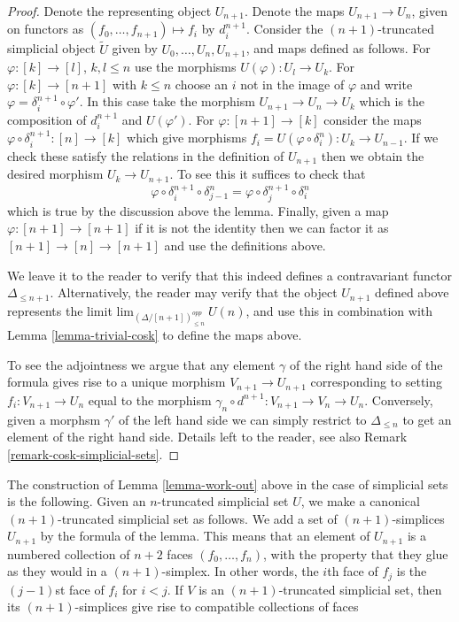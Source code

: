 \begin{proof}
Denote the representing object $U_{n + 1}$. Denote the maps
$U_{n + 1} \to U_n$, given on functors as
$(f_0,\ldots,f_{n + 1}) \mapsto f_i$ by
$d^{n + 1}_i$. Consider the $(n + 1)$-truncated
simplicial object $\tilde U$ given by $U_0, \ldots, U_n, U_{n + 1}$, and
maps defined as follows. For $\varphi : [k] \to [l]$, $k,l \leq n$
use the morphisms $U(\varphi) : U_l \to U_k$.
For $\varphi : [k] \to [n + 1]$ with $k \leq n$ choose
an $i$ not in the image of $\varphi$ and write
$\varphi = \delta^{n + 1}_i \circ \varphi'$. In this case take
the morphism $U_{n + 1} \to U_n \to U_k$ which is
the composition of $d^{n + 1}_i$ and $U(\varphi')$.
For $\varphi : [n + 1] \to [k]$ consider the maps
$\varphi \circ \delta^{n + 1}_i : [n] \to [k]$ which
give morphisms $f_i = U(\varphi \circ \delta^n_i) : U_k \to U_{n - 1}$.
If we check these satisfy the relations in the definition
of $U_{n + 1}$ then we obtain the desired morphism $U_k \to U_{n + 1}$.
To see this it suffices to check that
$$
\varphi \circ \delta^{n + 1}_i \circ \delta^n_{j - 1}
=
\varphi \circ \delta^{n + 1}_j \circ \delta^n_i
$$
which is true by the discussion above the lemma.
Finally, given a map $\varphi : [n + 1] \to [n + 1]$
if it is not the identity then we can factor it
as $[n + 1] \to [n] \to [n + 1]$ and use the definitions
above.

\medskip\noindent
We leave it to the reader to verify that this indeed
defines a contravariant functor $\Delta_{\leq n + 1}$.
Alternatively, the reader may verify that the object $U_{n + 1}$
defined above represents the limit
$\text{lim}_{(\Delta/[n + 1])_{\leq n}^{opp}}\ U(n)$,
and use this in combination with Lemma \ref{lemma-trivial-cosk} to define
the maps above.

\medskip\noindent
To see the adjointness we argue that any element
$\gamma$ of the right hand side of the formula
gives rise to a unique morphism $V_{n + 1} \to U_{n + 1}$
corresponding to setting $f_i : V_{n+1} \to U_n$
equal to the morphism $\gamma_n \circ d^{n+1} : V_{n+1} \to V_n \to U_n$.
Conversely, given a morphsm $\gamma'$ of the left hand side
we can simply restrict to $\Delta_{\leq n}$ to get an element
of the right hand side.
Details left to the reader, see also
Remark \ref{remark-cosk-simplicial-sets}.
\end{proof}

\begin{remark}
\label{remark-cosk-simplicial-sets}
The construction of Lemma \ref{lemma-work-out}
above in the case of simplicial
sets is the following. Given an $n$-truncated simplicial
set $U$, we make a canonical $(n + 1)$-truncated simplicial
set as follows. We add a set of $(n + 1)$-simplices
$U_{n + 1}$ by the formula of the lemma. This means that
an element of $U_{n + 1}$ is a numbered collection of
$n + 2$ faces $(f_0,\ldots,f_n)$, with the property that they glue
as they would in a $(n + 1)$-simplex. In other words,
the $i$th face of $f_j$ is the $(j-1)$st face of $f_i$
for $i < j$. If $V$ is an $(n + 1)$-truncated simplicial set,
then its $(n + 1)$-simplices give rise to compatible collections
of faces

\end{remark}


